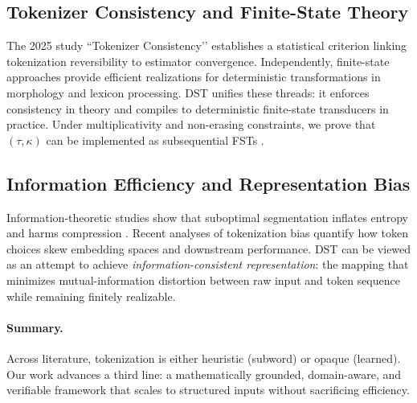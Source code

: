 \subsection{Tokenizer Consistency and Finite-State Theory}

The 2025 study “Tokenizer Consistency’’ \citep{wei2025tokenizer} establishes a statistical criterion linking tokenization reversibility to estimator convergence.  
Independently, finite-state approaches \citep{mohri1997finite, mohri2004weighted, beesley2003finite} provide efficient realizations for deterministic transformations in morphology and lexicon processing.  
DST unifies these threads: it enforces consistency in theory and compiles to deterministic finite-state transducers in practice.  
Under multiplicativity and non-erasing constraints, we prove that $(\tau,\kappa)$ can be implemented as subsequential FSTs \citep{choffrut1979sequential}.  

\subsection{Information Efficiency and Representation Bias}

Information-theoretic studies show that suboptimal segmentation inflates entropy and harms compression \citep{brown1992statistical, shannon1948mathematical}.  
Recent analyses of tokenization bias \citep{bostrom2020byte, ramesh2021tokenization, liu2024tokeneval} quantify how token choices skew embedding spaces and downstream performance.  
DST can be viewed as an attempt to achieve \emph{information-consistent representation}: the mapping that minimizes mutual-information distortion between raw input and token sequence while remaining finitely realizable.

\paragraph{Summary.}
Across literature, tokenization is either heuristic (subword) or opaque (learned).  
Our work advances a third line: a mathematically grounded, domain-aware, and verifiable framework that scales to structured inputs without sacrificing efficiency.
